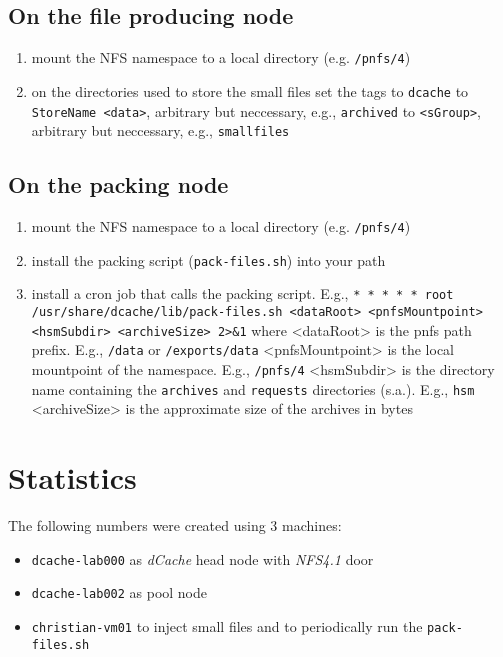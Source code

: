 \documentclass[a4paper,8pt]{scrartcl}
\begin{document}
\subsection{On the file producing node}
\begin{enumerate}
  \item mount the NFS namespace to a local directory (e.g. \texttt{/pnfs/4})
  \item on the directories used to store the small files set the tags
     to \texttt{dcache}
     to \texttt{StoreName <data>}, arbitrary but neccessary, e.g., \texttt{archived}
     to \texttt{<sGroup>}, arbitrary but neccessary, e.g., \texttt{smallfiles}
\end{enumerate}

\subsection{On the packing node}
\begin{enumerate}
  \item mount the NFS namespace to a local directory (e.g. \texttt{/pnfs/4})
  \item install the packing script (\texttt{pack-files.sh}) into your path
  \item install a cron job that calls the packing script. E.g., 
    \subitem \texttt{*  *  *  *  * root /usr/share/dcache/lib/pack-files.sh <dataRoot> <pnfsMountpoint> <hsmSubdir> <archiveSize> 2>\&1}
    \subitem where <dataRoot> is the pnfs path prefix. E.g., \texttt{/data} or \texttt{/exports/data}
    \subitem <pnfsMountpoint> is the local mountpoint of the namespace. E.g., \texttt{/pnfs/4}
    \subitem <hsmSubdir> is the directory name containing the \texttt{archives} and \texttt{requests} directories (s.a.). E.g., \texttt{hsm}
    \subitem <archiveSize> is the approximate size of the archives in bytes
\end{enumerate}

\section{Statistics}
The following numbers were created using 3 machines:
\begin{itemize}
  \item \texttt{dcache-lab000} as \emph{dCache} head node with \emph{NFS4.1} door
  \item \texttt{dcache-lab002} as pool node
  \item \texttt{christian-vm01} to inject small files and to periodically run the \texttt{pack-files.sh}
\end{itemize}
\end{document}
